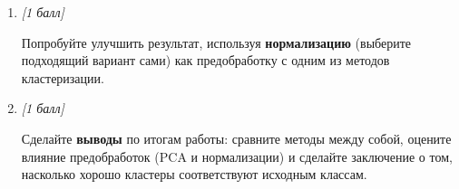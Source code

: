 \begin{enumerate}[label=\textbf{Task \arabic*:}, leftmargin=*]
\item \textit{[1 балл]}

Попробуйте улучшить результат, используя \textbf{нормализацию} (выберите подходящий вариант сами) как предобработку с одним из методов кластеризации.

\item \textit{[1 балл]}

Сделайте \textbf{выводы} по итогам работы: сравните методы между собой, оцените влияние предобработок (PCA и нормализации) и сделайте заключение о том, насколько хорошо кластеры соответствуют исходным классам.

\end{enumerate}